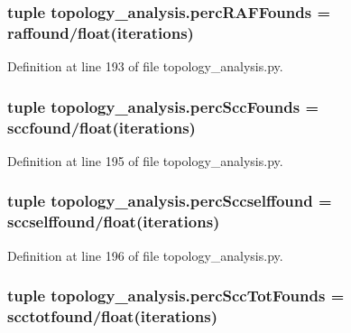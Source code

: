 \hypertarget{a00159_a51a66ce80f70aeab8bde70af9960e419}{
\subsubsection[{perc\+R\+A\+F\+Founds}]{\setlength{\rightskip}{0pt plus 5cm}tuple topology\+\_\+analysis.\+perc\+R\+A\+F\+Founds = {\bf raffound}/float({\bf iterations})}}\label{a00159_a51a66ce80f70aeab8bde70af9960e419}


Definition at line 193 of file topology\+\_\+analysis.\+py.

\hypertarget{a00159_a14f23c89de77042b80e78e1d9ab7b754}{
\subsubsection[{perc\+Scc\+Founds}]{\setlength{\rightskip}{0pt plus 5cm}tuple topology\+\_\+analysis.\+perc\+Scc\+Founds = {\bf sccfound}/float({\bf iterations})}}\label{a00159_a14f23c89de77042b80e78e1d9ab7b754}


Definition at line 195 of file topology\+\_\+analysis.\+py.

\hypertarget{a00159_a8bf55c62b8e7385526396a9003e343bb}{
\subsubsection[{perc\+Sccselffound}]{\setlength{\rightskip}{0pt plus 5cm}tuple topology\+\_\+analysis.\+perc\+Sccselffound = {\bf sccselffound}/float({\bf iterations})}}\label{a00159_a8bf55c62b8e7385526396a9003e343bb}


Definition at line 196 of file topology\+\_\+analysis.\+py.

\hypertarget{a00159_aee49954a6b9abb7c4bd677c17ed4013b}{
\subsubsection[{perc\+Scc\+Tot\+Founds}]{\setlength{\rightskip}{0pt plus 5cm}tuple topology\+\_\+analysis.\+perc\+Scc\+Tot\+Founds = {\bf scctotfound}/float({\bf iterations})}}\label{a00159_aee49954a6b9abb7c4bd677c17ed4013b}


